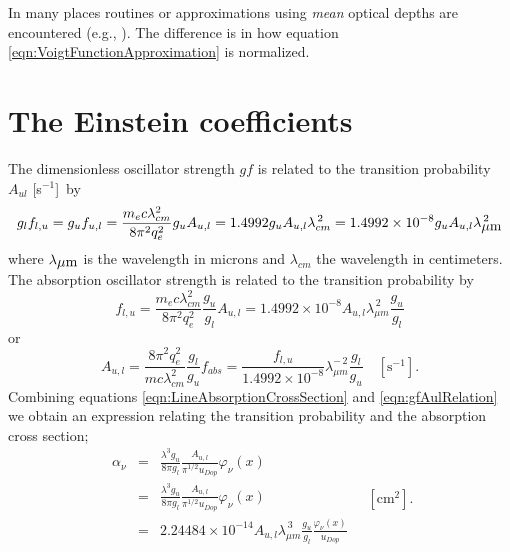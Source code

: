 In many places routines or approximations using
\emph{mean} optical depths are encountered
(e.g., \citealp{Hummer1980}).
The difference is in how
equation \ref{eqn:VoigtFunctionApproximation} is normalized.

\section{The Einstein coefficients}

The dimensionless oscillator strength $gf$ is related to the transition
probability $A_{ul}$ [s$^{-1}$]~by
\begin{equation}
{g_l}{f_{l,u}} = {g_u}{f_{u,l}} = \frac{{{m_e}c\lambda _{cm}^2}}{{8{\pi
^2}q_e^2}}{g_u}{A_{u,l}} = 1.4992{g_u}{A_{u,l}}\lambda _{cm}^{\,2} = 1.4992
\times {10^{ - 8}}{g_u}{A_{u,l}}\lambda _{\hbox{$\mu$m}}^{\,2}
\end{equation}
where $\lambda_{\hbox{$\mu$m}}$ is the wavelength in microns and $\lambda_{cm}$ the wavelength in centimeters.
The absorption oscillator strength is related to the
transition probability by
\begin{equation}
\label{eqn:gfAulRelation}
{f_{l,u}} = \frac{{{m_e}c\lambda _{cm}^2}}{{8{\pi
^2}q_e^2}}\frac{{{g_u}}}{{{g_l}}}{A_{u,l}} = 1.4992 \times {10^{ -
8}}{A_{u,l}}\lambda _{\mu m}^{\,2}\frac{{{g_u}}}{{{g_l}}}
\end{equation}
or
\begin{equation}
{A_{u,l}} = \frac{{8{\pi ^2}q_e^2}}{{mc\lambda
_{cm}^2}}\frac{{{g_l}}}{{{g_u}}}{f_{abs}} = \frac{{{f_{l,u}}}}{{1.4992 \times
{{10}^{ - 8}}}}\lambda _{\mu m}^{ - \,2}\frac{{{g_l}}}{{{g_u}}}\quad
[\mathrm{s}^{-1}].
\end{equation}
Combining equations \ref{eqn:LineAbsorptionCrossSection}
and \ref{eqn:gfAulRelation} we obtain an expression relating the
transition probability and the absorption cross section;
\begin{equation}
\begin{array}{ccl}
 {\alpha _\nu }& =& \frac{{{\lambda ^3}{g_u}}}{{8\pi
{g_l}}}\frac{{{A_{u,l}}}}{{{\pi ^{1/2}}{u_{Dop}}}}{\varphi _\nu }\left(
x \right) \\
&=& \frac{{{\lambda ^3}{g_u}}}{{8\pi {g_l}}}\frac{{{A_{u,l}}}}{{{\pi
^{1/2}}{u_{Dop}}}}{\varphi _\nu }\left( x \right) \\
&=& 2.24484 \times {10^{ - 14}}{A_{u,l}}\lambda _{\mu
m}^{\,3}\frac{{{g_u}}}{{{g_l}}}\frac{{{\varphi _\nu }\left( x
\right)}}{{{u_{Dop}}}} \\
 \end{array}
\quad  [\mathrm{cm}^2].
\end{equation}
